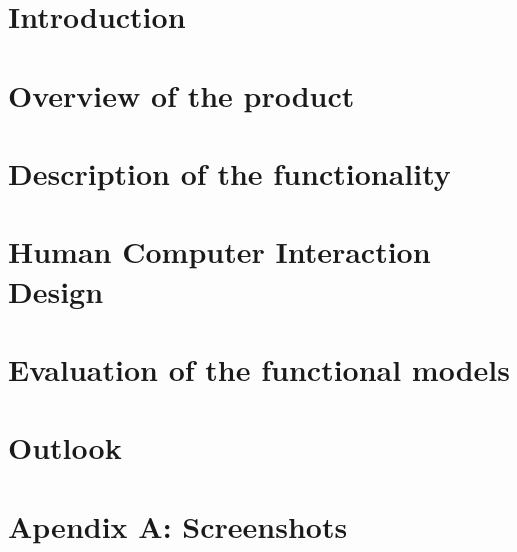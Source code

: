 \documentclass[a4paper]{article}
\begin{document}
	
	
	
	\clearpage
	
	\tableofcontents
	\clearpage
	
	\section{Introduction}
	
	
	\section{Overview of the product}
	
		
	\section{Description of the functionality}
	
		
	\section{Human Computer Interaction Design}
	
		
	\section{Evaluation of the functional models}
	
		
	\section{Outlook}
	
	
	\section{Apendix A: Screenshots}
	
	
	\clearpage
	{}
	
	
\end{document}
